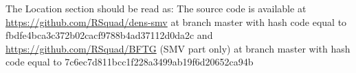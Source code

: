 
The Location section should be read as:
The source code is available at \url{https://github.com/RSquad/dens-smv} at branch master with
hash code equal to fbdfe4bca3c372b02cacf9788b4ad37112d0da2c
and
\url{https://github.com/RSquad/BFTG} (SMV part only) at branch master with hash code equal to
7c6ec7d811bcc1f228a3499ab19f6d20652ca94b
